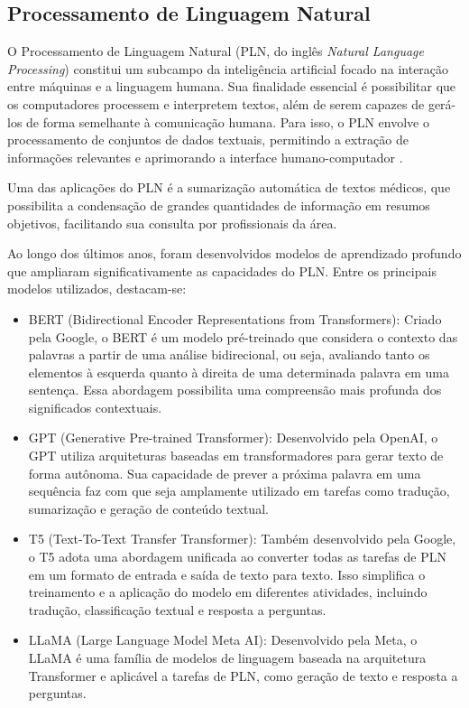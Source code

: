\subsection{Processamento de Linguagem Natural}

O Processamento de Linguagem Natural (PLN, do inglês \textit{Natural Language Processing}) constitui um subcampo da inteligência artificial focado na interação entre máquinas e a linguagem humana. Sua finalidade essencial é possibilitar que os computadores processem e interpretem textos, além de serem capazes de gerá-los de forma semelhante à comunicação humana. Para isso, o PLN envolve o processamento de conjuntos de dados textuais, permitindo a extração de informações relevantes e aprimorando a interface humano-computador \cite{stryker2024o}.

Uma das aplicações do PLN é a sumarização automática de textos médicos, que possibilita a condensação de grandes quantidades de informação em resumos objetivos, facilitando sua consulta por profissionais da área.

Ao longo dos últimos anos, foram desenvolvidos modelos de aprendizado profundo que ampliaram significativamente as capacidades do PLN. Entre os principais modelos utilizados, destacam-se:

\begin{itemize}
    \item BERT (Bidirectional Encoder Representations from Transformers): Criado pela Google, o BERT é um modelo pré-treinado que considera o contexto das palavras a partir de uma análise bidirecional, ou seja, avaliando tanto os elementos à esquerda quanto à direita de uma determinada palavra em uma sentença. Essa abordagem possibilita uma compreensão mais profunda dos significados contextuais.
    \item GPT (Generative Pre-trained Transformer): Desenvolvido pela OpenAI, o GPT utiliza arquiteturas baseadas em transformadores para gerar texto de forma autônoma. Sua capacidade de prever a próxima palavra em uma sequência faz com que seja amplamente utilizado em tarefas como tradução, sumarização e geração de conteúdo textual.
    \item T5 (Text-To-Text Transfer Transformer): Também desenvolvido pela Google, o T5 adota uma abordagem unificada ao converter todas as tarefas de PLN em um formato de entrada e saída de texto para texto. Isso simplifica o treinamento e a aplicação do modelo em diferentes atividades, incluindo tradução, classificação textual e resposta a perguntas.
    \item LLaMA (Large Language Model Meta AI): Desenvolvido pela Meta, o LLaMA é uma família de modelos de linguagem baseada na arquitetura Transformer e aplicável a tarefas de PLN, como geração de texto e resposta a perguntas.
\end{itemize}

